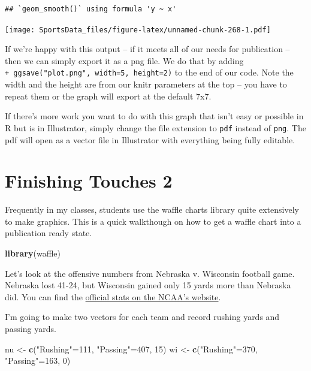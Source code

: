\documentclass[]{book}
\newenvironment{Shaded}{\begin{snugshade}}{\end{snugshade}}
\newcommand{\DecValTok}[1]{\textcolor[rgb]{0.00,0.00,0.81}{#1}}
\newcommand{\KeywordTok}[1]{\textcolor[rgb]{0.13,0.29,0.53}{\textbf{#1}}}
\newcommand{\NormalTok}[1]{#1}
\newcommand{\StringTok}[1]{\textcolor[rgb]{0.31,0.60,0.02}{#1}}
\begin{document}
\begin{verbatim}
## `geom_smooth()` using formula 'y ~ x'
\end{verbatim}

\texttt{[image: SportsData\_files/figure-latex/unnamed-chunk-268-1.pdf]}

If we're happy with this output -- if it meets all of our needs for publication -- then we can simply export it as a png file. We do that by adding \texttt{+\ ggsave("plot.png",\ width=5,\ height=2)} to the end of our code. Note the width and the height are from our knitr parameters at the top -- you have to repeat them or the graph will export at the default 7x7.

If there's more work you want to do with this graph that isn't easy or possible in R but is in Illustrator, simply change the file extension to \texttt{pdf} instead of \texttt{png}. The pdf will open as a vector file in Illustrator with everything being fully editable.

\hypertarget{finishing-touches-2}{%
\chapter{Finishing Touches 2}\label{finishing-touches-2}}

Frequently in my classes, students use the waffle charts library quite extensively to make graphics. This is a quick walkthough on how to get a waffle chart into a publication ready state.

\begin{Shaded}
\begin{Highlighting}[]
\KeywordTok{library}\NormalTok{(waffle)}
\end{Highlighting}
\end{Shaded}

Let's look at the offensive numbers from Nebraska v. Wisconsin football game. Nebraska lost 41-24, but Wisconsin gained only 15 yards more than Nebraska did. You can find the \href{https://www.ncaa.com/game/football/fbs/2018/10/06/nebraska-wisconsin/team-stats}{official stats on the NCAA's website}.

I'm going to make two vectors for each team and record rushing yards and passing yards.

\begin{Shaded}
\begin{Highlighting}[]
\NormalTok{nu <-}\StringTok{ }\KeywordTok{c}\NormalTok{(}\StringTok{"Rushing"}\NormalTok{=}\DecValTok{111}\NormalTok{, }\StringTok{"Passing"}\NormalTok{=}\DecValTok{407}\NormalTok{, }\DecValTok{15}\NormalTok{)}
\NormalTok{wi <-}\StringTok{ }\KeywordTok{c}\NormalTok{(}\StringTok{"Rushing"}\NormalTok{=}\DecValTok{370}\NormalTok{, }\StringTok{"Passing"}\NormalTok{=}\DecValTok{163}\NormalTok{, }\DecValTok{0}\NormalTok{)}
\end{Highlighting}
\end{Shaded}
\end{document}
